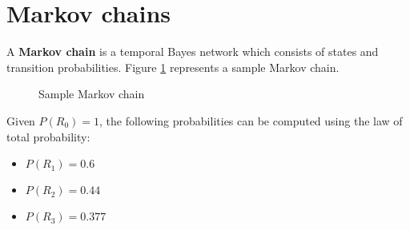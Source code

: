 \documentclass{report}
\begin{document}
\section{Markov chains}
\label{ref:markovchains}
A {\bf Markov chain} is a temporal Bayes network which consists of states and transition probabilities. Figure \ref{ref:samplemarkovchain} represents a sample Markov chain.

\begin{figure}[h!]
\centering
{}
\caption{Sample Markov chain}
\label{ref:samplemarkovchain}
\end{figure}

Given $P(R_0)=1$, the following probabilities can be computed using the law of total probability:
\begin{itemize}
\item $P(R_1)=0.6$
\item $P(R_2)=0.44$
\item $P(R_3)=0.377$
\end{itemize}
\end{document}
